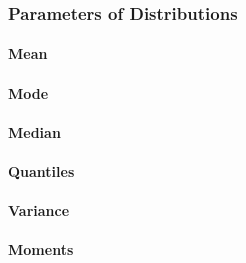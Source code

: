 \subsubsection{Parameters of Distributions}

\paragraph{Mean}








\paragraph{Mode}

\paragraph{Median}

\paragraph{Quantiles}

\paragraph{Variance}



\paragraph{Moments}


